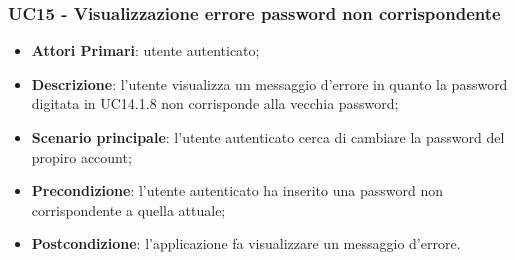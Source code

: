 \subsubsection{UC15 - Visualizzazione errore password non corrispondente}
\begin{itemize}
	\item \textbf{Attori Primari}: utente autenticato;
	\item \textbf{Descrizione}: l'utente visualizza un messaggio d'errore in quanto 			la password digitata in UC14.1.8 non corrisponde alla vecchia password;
	\item \textbf{Scenario principale}: l'utente autenticato cerca di cambiare la 			password del propiro account;
	\item \textbf{Precondizione}: l'utente autenticato ha inserito una password non 			corrispondente a quella attuale;
	\item \textbf{Postcondizione}: l'applicazione fa visualizzare un messaggio 				d'errore.
\end{itemize}